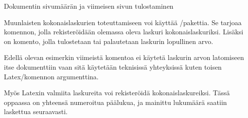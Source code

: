 \begin{esimerkki*}
\caption{Dokumentin sivumäärän ja viimeisen sivun tulostaminen}
\label{esim:totpages}
\end{esimerkki*}

Muunlaisten kokonaislaskurien toteuttamiseen voi käyttää
\-/pakettia. Se tarjoaa komennon,
jolla rekisteröidään olemassa oleva laskuri kokonaislaskuriksi. Lisäksi
on komento, jolla tulostetaan tai palautetaan laskurin lopullinen arvo.

\begin{koodilohkosis}
  \addtocounter{oma}{1} %
\end{koodilohkosis}

Edellä olevan esimerkin viimeistä komentoa  ei
käytetä laskurin arvon latomiseen itse dokumenttiin vaan sitä käytetään
teknisissä yhteyksissä kuten toisen Latex\-/komennon argumenttina.

Myös Latexin valmiita laskureita voi rekisteröidä kokonaislaskureiksi.
Tässä oppaassa on yhteensä  numeroitua päälukua, ja
mainittu lukumäärä saatiin laskettua seuraavasti.

\begin{koodilohkosis}
\end{koodilohkosis}
